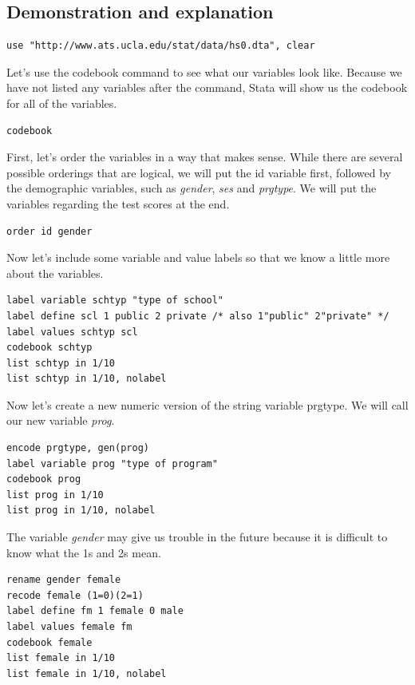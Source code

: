 \documentclass{article}
\begin{document}
\subsection{Demonstration and explanation}

\begin{lstlisting}
use "http://www.ats.ucla.edu/stat/data/hs0.dta", clear
\end{lstlisting}

Let's use the codebook command to see what our variables look like.  Because we have not listed any variables after the command, Stata will show us the codebook for all of the variables.

\begin{lstlisting}
codebook
\end{lstlisting}

First, let's order the variables in a way that makes sense.  While there are several possible orderings that are logical, we will put the id variable first, followed by the demographic variables, such as \textit{gender}, \textit{ses} and \textit{prgtype}.  We will put the variables regarding the test scores at the end.

\begin{lstlisting}
order id gender
\end{lstlisting}

Now let's include some variable and value labels so that we know a little more about the variables.

\begin{lstlisting}
label variable schtyp "type of school"
label define scl 1 public 2 private /* also 1"public" 2"private" */
label values schtyp scl
codebook schtyp
list schtyp in 1/10
list schtyp in 1/10, nolabel
\end{lstlisting}

Now let's create a new numeric version of the string variable prgtype.  We will call our new variable \textit{prog}.

\begin{lstlisting}
encode prgtype, gen(prog)
label variable prog "type of program"
codebook prog
list prog in 1/10
list prog in 1/10, nolabel
\end{lstlisting}

The variable \textit{gender} may give us trouble in the future because it is difficult to know what the 1s and 2s mean.

\begin{lstlisting}
rename gender female
recode female (1=0)(2=1)
label define fm 1 female 0 male
label values female fm
codebook female
list female in 1/10
list female in 1/10, nolabel
\end{lstlisting}
\end{document}
